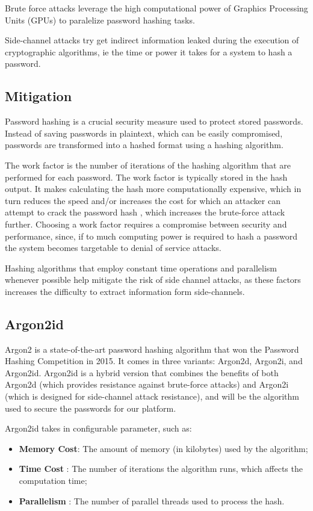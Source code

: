 Brute force attacks leverage the high computational power of Graphics Processing Units (GPUs) to paralelize password hashing tasks.

Side-channel attacks try get indirect information leaked during the execution of cryptographic algorithms, ie the time or power it takes for a system to hash a password.

\subsection{Mitigation}

Password hashing is a crucial security measure used to protect stored passwords. Instead of saving passwords in plaintext, which can be easily compromised, passwords are transformed into a hashed format using a hashing algorithm.

The work factor is the number of iterations of the hashing algorithm that are performed for each password. The work factor is typically stored in the hash output. It makes calculating the hash more computationally expensive, which in turn reduces the speed and/or increases the cost for which an attacker can attempt to crack the password hash \cite{owasp_password_storage}, which increases the brute-force attack further.
Choosing a work factor requires a compromise between security and performance, since, if to much computing power is required to hash a password the system becomes targetable to denial of service attacks.

Hashing algorithms that employ constant time operations and parallelism whenever possible help mitigate the risk of side channel attacks, as these factors increases the difficulty to extract information form side-channels.  


\subsection{Argon2id}
Argon2\cite{rfc9106} is a state-of-the-art password hashing algorithm that won the Password Hashing Competition in 2015. It comes in three variants: Argon2d, Argon2i, and Argon2id. Argon2id is a hybrid version that combines the benefits of both Argon2d (which provides resistance against brute-force attacks) and Argon2i (which is designed for side-channel attack resistance), and will be the algorithm used to secure the passwords for our platform.

Argon2id takes in configurable parameter, such as:
\begin{itemize}
	\item \textbf{Memory Cost}: The amount of memory (in kilobytes) used by the algorithm;
	\item \textbf{Time Cost} : The number of iterations the algorithm runs, which affects the computation time;
	\item \textbf{Parallelism} : The number of parallel threads used to process the hash.
\end{itemize}

